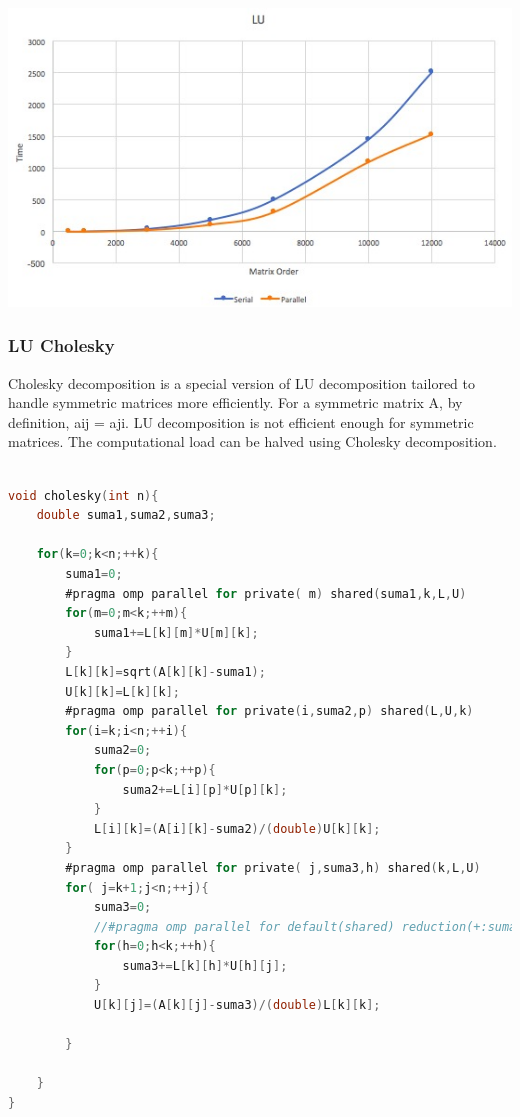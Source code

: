 \documentclass{article}
\newcounter{subsubsubsection}[subsubsection]
\begin{document}
\includegraphics[width=\linewidth]{./images/glu.jpeg}\\


\subsubsection{LU Cholesky}


Cholesky decomposition is a special version of LU decomposition tailored to handle symmetric
matrices more efficiently.
For a symmetric matrix A, by definition, aij = aji. LU decomposition is not efficient enough
for symmetric matrices. The computational load can be halved using Cholesky decomposition.




\begin{lstlisting}[language=C]

void cholesky(int n){
    double suma1,suma2,suma3;
    
    for(k=0;k<n;++k){
        suma1=0;
        #pragma omp parallel for private( m) shared(suma1,k,L,U)
        for(m=0;m<k;++m){
            suma1+=L[k][m]*U[m][k];
        }
        L[k][k]=sqrt(A[k][k]-suma1);
        U[k][k]=L[k][k];
        #pragma omp parallel for private(i,suma2,p) shared(L,U,k)
        for(i=k;i<n;++i){
            suma2=0;
            for(p=0;p<k;++p){
                suma2+=L[i][p]*U[p][k];
            }
            L[i][k]=(A[i][k]-suma2)/(double)U[k][k];
        }
        #pragma omp parallel for private( j,suma3,h) shared(k,L,U)
        for( j=k+1;j<n;++j){
            suma3=0;
            //#pragma omp parallel for default(shared) reduction(+:suma3)
            for(h=0;h<k;++h){
                suma3+=L[k][h]*U[h][j];
            }
            U[k][j]=(A[k][j]-suma3)/(double)L[k][k];
         
        }

    }
}

\end{lstlisting}
\end{document}
